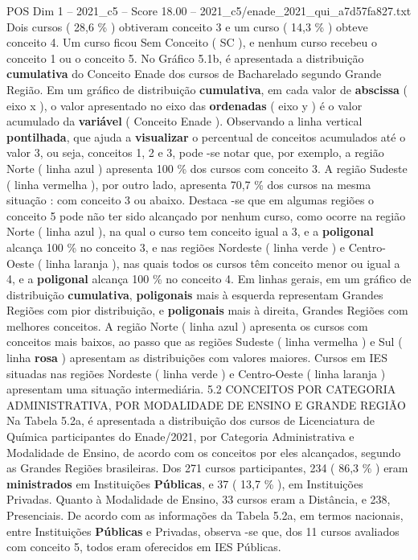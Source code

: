 \begin{textsample}{POS Dim 1 – 2021\_c5 – Score 18.00 – 2021\_c5/enade\_2021\_qui\_a7d57fa827.txt}
Dois cursos ( 28,6 \% ) obtiveram conceito 3 e um curso ( 14,3 \% ) obteve conceito 4.
Um curso ficou Sem Conceito ( SC ), e nenhum curso recebeu o conceito 1 ou o conceito 5.
No Gráfico 5.1b, é apresentada a distribuição \textbf{cumulativa} do Conceito Enade dos cursos de Bacharelado segundo Grande Região.
Em um gráfico de distribuição \textbf{cumulativa}, em cada valor de \textbf{abscissa} ( eixo x ), o valor apresentado no eixo das \textbf{ordenadas} ( eixo y ) é o valor acumulado da \textbf{variável} ( Conceito Enade ).
Observando a linha vertical \textbf{pontilhada}, que ajuda a \textbf{visualizar} o percentual de conceitos acumulados até o valor 3, ou seja, conceitos 1, 2 e 3, pode -se notar que, por exemplo, a região Norte ( linha azul ) apresenta 100 \% dos cursos com conceito 3.
A região Sudeste ( linha vermelha ), por outro lado, apresenta 70,7 \% dos cursos na mesma situação : com conceito 3 ou abaixo.
Destaca -se que em algumas regiões o conceito 5 pode não ter sido alcançado por nenhum curso, como ocorre na região Norte ( linha azul ), na qual o curso tem conceito igual a 3, e a \textbf{poligonal} alcança 100 \% no conceito 3, e nas regiões Nordeste ( linha verde ) e Centro-Oeste ( linha laranja ), nas quais todos os cursos têm conceito menor ou igual a 4, e a \textbf{poligonal} alcança 100 \% no conceito 4.
Em linhas gerais, em um gráfico de distribuição \textbf{cumulativa}, \textbf{poligonais} mais à esquerda representam Grandes Regiões com pior distribuição, e \textbf{poligonais} mais à direita, Grandes Regiões com melhores conceitos.
A região Norte ( linha azul ) apresenta os cursos com conceitos mais baixos, ao passo que as regiões Sudeste ( linha vermelha ) e Sul ( linha \textbf{rosa} ) apresentam as distribuições com valores maiores.
Cursos em IES situadas nas regiões Nordeste ( linha verde ) e Centro-Oeste ( linha laranja ) apresentam uma situação intermediária. 5.2 CONCEITOS POR CATEGORIA ADMINISTRATIVA, POR MODALIDADE DE ENSINO E GRANDE REGIÃO Na Tabela 5.2a, é apresentada a distribuição dos cursos de Licenciatura de Química participantes do Enade/2021, por Categoria Administrativa e Modalidade de Ensino, de acordo com os conceitos por eles alcançados, segundo as Grandes Regiões brasileiras.
Dos 271 cursos participantes, 234 ( 86,3 \% ) eram \textbf{ministrados} em Instituições \textbf{Públicas}, e 37 ( 13,7 \% ), em Instituições Privadas.
Quanto à Modalidade de Ensino, 33 cursos eram a Distância, e 238, Presenciais.
De acordo com as informações da Tabela 5.2a, em termos nacionais, entre Instituições \textbf{Públicas} e Privadas, observa -se que, dos 11 cursos avaliados com conceito 5, todos eram oferecidos em IES Públicas.

\end{textsample}
